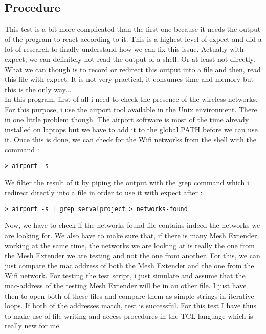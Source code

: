 \subsection{Procedure}
This test is a bit more complicated than the first one because it needs the output of the program to react according to it. This is a highest level of expect and did a lot of research to finally understand how we can fix this issue. Actually with expect, we can definitely not read the output of a shell. Or at least not directly. What we can though is to record or redirect this output into a file and then, read this file with expect. It is not very practical, it consumes time and memory but this is the only way... \\
In this program, first of all i need to check the presence of the wireless networks. For this purpose, i use the airport tool available in the Unix environment. There in one little problem though. The airport software is most of the time already installed on laptops but we have to add it to the global PATH before we can use it. Once this is done, we can check for the Wifi networks from the shell with the command : \\
\begin{lstlisting}
> airport -s 
\end{lstlisting}
We filter the result of it by piping the output with the grep command which i redirect directly into a file in order to use it with expect after :
\begin{lstlisting}
> airport -s | grep servalproject > networks-found 
\end{lstlisting}
Now, we have to check if the networks-found file contains indeed the networks we are looking for. We also have to make sure that, if there is many Mesh Extender working at the same time, the networks we are looking at is really the one from the Mesh Extender we are testing and not the one from another. For this, we can just compare the mac address of both the Mesh Extender and the one from the Wifi network. For testing the test script, i just simulate and assume that the mac-address of the testing Mesh Extender will be in an other file. I just have then to open both of these files and compare them as simple strings in iterative loops. If both of the addresses match, test is successful. For this test I have thus to make use of file writing and access procedures in the TCL language which is really new for me. 

